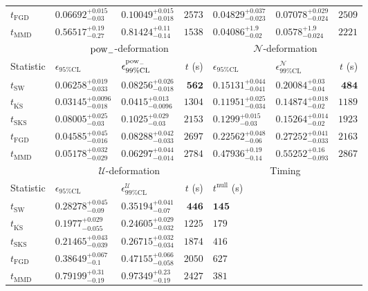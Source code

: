 \begin{tabular}{l|llr|llr}
	$t_{\mathrm{FGD}}$ & ${\mathbf{0.06692_{-0.03}^{+0.015}}}$ & ${\mathbf{0.10049_{-0.018}^{+0.015}}}$ & $2573$ & $0.04829_{-0.023}^{+0.037}$ & $0.07078_{-0.024}^{+0.029}$ & $2509$ \\
	$t_{\mathrm{MMD}}$ & $0.56517_{-0.27}^{+0.19}$ & $0.81424_{-0.14}^{+0.11}$ & $1538$ & $0.04086_{-0.02}^{+1.9}$ & $0.0578_{-0.024}^{+1.9}$ & $2221$ \\
	\toprule
	\multicolumn{1}{c}{} & \multicolumn{3}{c}{$\rm{pow}_{-}$-deformation} & \multicolumn{3}{c}{$\mathcal{N}$-deformation} \\
	Statistic & $\epsilon_{95\%\mathrm{CL}}$ & $\epsilon^  {\rm{pow}_{-}}_{99\%\mathrm{CL}}$ & $t$ (s) & $\epsilon_{95\%\mathrm{CL}}$ & $\epsilon^    {\mathcal{N}}_{99\%\mathrm{CL}}$ & $t$ (s) \\
	\midrule
	$t_{\mathrm{SW}}$ & $0.06258_{-0.033}^{+0.019}$ & $0.08256_{-0.018}^{+0.026}$ & ${\mathbf{562}}$ & $0.15131_{-0.041}^{+0.044}$ & $0.20084_{-0.04}^{+0.03}$ & ${\mathbf{484}}$ \\
	$t_{\overline{\mathrm{KS}}}$ & ${\mathbf{0.03145_{-0.018}^{+0.0096}}}$ & ${\mathbf{0.0415_{-0.0096}^{+0.013}}}$ & $1304$ & ${\mathbf{0.11951_{-0.034}^{+0.025}}}$ & ${\mathbf{0.14874_{-0.02}^{+0.018}}}$ & $1189$ \\
	$t_{\mathrm{SKS}}$ & $0.08005_{-0.03}^{+0.025}$ & $0.1025_{-0.03}^{+0.029}$ & $2153$ & $0.1299_{-0.03}^{+0.015}$ & $0.15264_{-0.02}^{+0.014}$ & $1923$ \\
	$t_{\mathrm{FGD}}$ & $0.04585_{-0.016}^{+0.045}$ & $0.08288_{-0.033}^{+0.042}$ & $2697$ & $0.22562_{-0.06}^{+0.048}$ & $0.27252_{-0.033}^{+0.041}$ & $2163$ \\
	$t_{\mathrm{MMD}}$ & $0.05178_{-0.029}^{+0.032}$ & $0.06297_{-0.014}^{+0.044}$ & $2784$ & $0.47936_{-0.14}^{+0.19}$ & $0.55252_{-0.093}^{+0.16}$ & $2867$ \\
	\toprule
	\multicolumn{1}{c}{} & \multicolumn{3}{c}{$\mathcal{U}$-deformation} & \multicolumn{3}{c}{Timing} \\
	Statistic & $\epsilon_{95\%\mathrm{CL}}$ & $\epsilon^    {\mathcal{U}}_{99\%\mathrm{CL}}$ & $t$ (s) & $t^{\mathrm{null}}$ (s) \\
	\midrule
	$t_{\mathrm{SW}}$ & $0.28278_{-0.09}^{+0.045}$ & $0.35194_{-0.07}^{+0.041}$ & ${\mathbf{446}}$ & ${\mathbf{145}}$ \\
	$t_{\overline{\mathrm{KS}}}$ & ${\mathbf{0.1977_{-0.055}^{+0.029}}}$ & ${\mathbf{0.24605_{-0.032}^{+0.029}}}$ & $1225$ & $179$ \\
	$t_{\mathrm{SKS}}$ & $0.21465_{-0.039}^{+0.043}$ & $0.26715_{-0.034}^{+0.032}$ & $1874$ & $416$ \\
	$t_{\mathrm{FGD}}$ & $0.38649_{-0.1}^{+0.067}$ & $0.47155_{-0.058}^{+0.066}$ & $2050$ & $627$ \\
	$t_{\mathrm{MMD}}$ & $0.79199_{-0.19}^{+0.31}$ & $0.97349_{-0.19}^{+0.23}$ & $2427$ & $381$ \\
	\bottomrule
\end{tabular}